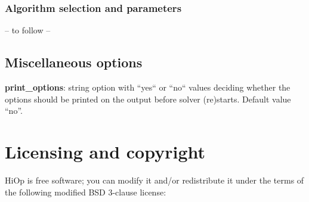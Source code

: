\documentclass[11pt]{article}
\begin{document}
\subsubsection{Algorithm selection and parameters}

-- to follow --

\subsection{Miscellaneous options}

\noindent \textbf{print\_options}: string option with ``yes`` or ``no`` values deciding whether the options should be printed on the output before solver (re)starts. Default value ``no''.

%

\section{Licensing and copyright}
HiOp is free software; you can modify it and/or redistribute it under the terms of the following  modified BSD 3-clause license:
\end{document}
